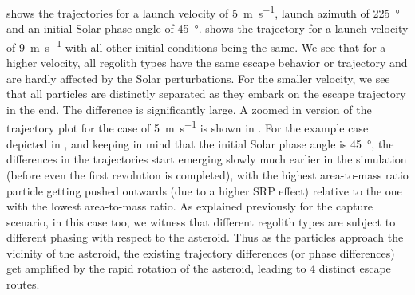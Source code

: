 \FloatBarrier
 shows the trajectories for a launch velocity of \SI{5}{\metre\per\second}, launch azimuth of \SI{225}{\degree} and an initial Solar phase angle of \SI{45}{\degree}.  shows the trajectory for a launch velocity of \SI{9}{\metre\per\second} with all other initial conditions being the same. We see that for a higher velocity, all regolith types have the same escape behavior or trajectory and are hardly affected by the Solar perturbations. For the smaller velocity, we see that all particles are distinctly separated as they embark on the escape trajectory in the end. The difference is significantly large. A zoomed in version of the trajectory plot for the case of \SI{5}{\metre\per\second} is shown in . For the example case depicted in , and keeping in mind that the initial Solar phase angle is \SI{45}{\degree}, the differences in the trajectories start emerging slowly much earlier in the simulation (before even the first revolution is completed), with the highest area-to-mass ratio particle getting pushed outwards (due to a higher \gls{SRP} effect) relative to the one with the lowest area-to-mass ratio. As explained previously for the capture scenario, in this case too, we witness that different regolith types are subject to different phasing with respect to the asteroid. Thus as the particles approach the vicinity of the asteroid, the existing trajectory differences (or phase differences) get amplified by the rapid rotation of the asteroid, leading to 4 distinct escape routes.
